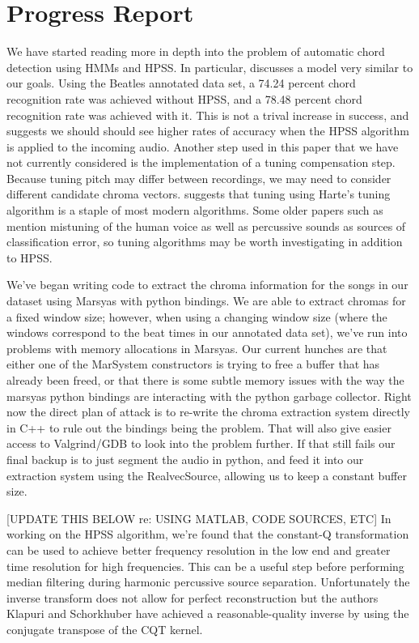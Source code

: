 \documentclass{article}
\begin{document}
\section{Progress Report}\label{sec:progreport}

We have started reading more in depth into the problem of automatic chord detection using
HMMs and HPSS. In particular, \cite{Ueda:19} discusses a model very similar to our goals. 
Using the Beatles annotated data set, a 74.24 percent chord recognition rate was 
achieved without HPSS, and a 78.48 percent chord recognition rate was achieved with it. This
is not a trival increase in success, and suggests we should should see higher rates of
accuracy when the HPSS algorithm is applied to the incoming audio. Another step used in this paper
that we have not currently considered is the implementation of a tuning compensation step. Because
tuning pitch may differ between recordings, we may need to consider different candidate chroma vectors.
\cite{McVicar:00} suggests that tuning using Harte's tuning algorithm is a staple of most modern algorithms.
Some older papers such as \cite{Zenz:20} mention mistuning of the human voice as well as percussive sounds as sources
of classification error, so tuning algorithms may be worth investigating in addition to HPSS.

We've began writing code to extract the chroma information for the songs in our dataset using Marsyas 
with python bindings. We are able to extract chromas for a fixed window size; however, when using a changing
window size (where the windows correspond to the beat times in our annotated data set), we've run into
problems with memory allocations in Marsyas. Our current hunches are that either one of the MarSystem constructors
is trying to free a buffer that has already been freed, or that there is some subtle memory issues with
the way the marsyas python bindings are interacting with the python garbage collector. Right now the direct
plan of attack is to re-write the chroma extraction system directly in C++ to rule out the bindings
being the problem. That will also give easier access to Valgrind/GDB to look into the problem further.
If that still fails our final backup is to just segment the audio in python, and feed it
into our extraction system using the RealvecSource, allowing us to keep a constant buffer size.

[UPDATE THIS BELOW re: USING MATLAB, CODE SOURCES, ETC]
In working on the HPSS algorithm, we're found that the constant-Q transformation can be used to achieve 
better frequency resolution in the low end and greater time resolution for high frequencies. This can be 
a useful step before performing median filtering during harmonic percussive source separation.
Unfortunately the inverse transform does not allow for perfect reconstruction but the 
authors Klapuri and Schorkhuber \cite{Schorkhuber:21} have achieved a reasonable-quality inverse by using the 
conjugate transpose of the CQT kernel.
\end{document}
